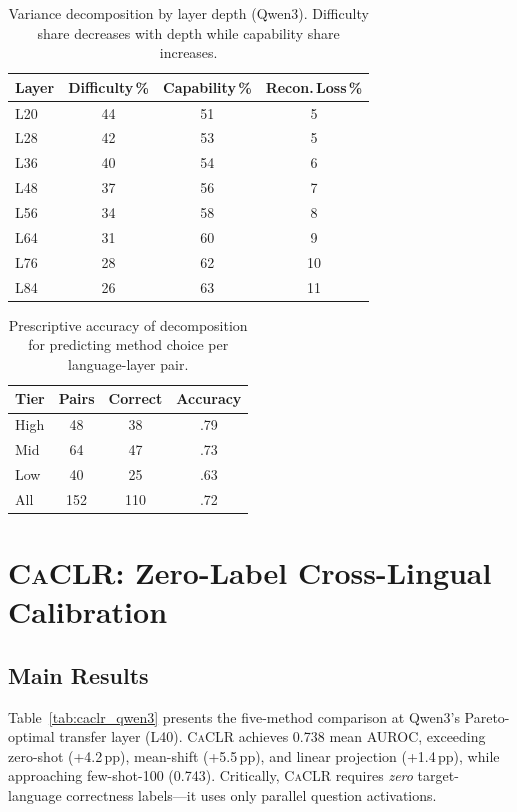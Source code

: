 \documentclass[11pt,a4paper]{article}
\newcommand{\caclr}{\textsc{CaCLR}}
\begin{document}
\begin{table}[t]
\centering
\small
\caption{Variance decomposition by layer depth (Qwen3). Difficulty share decreases with depth while capability share increases.}
\label{tab:variance_decomposition}
\begin{tabular}{lccc}
\toprule
Layer & Difficulty\,\% & Capability\,\% & Recon.\,Loss\,\% \\
\midrule
L20 & 44 & 51 & 5 \\
L28 & 42 & 53 & 5 \\
L36 & 40 & 54 & 6 \\
L48 & 37 & 56 & 7 \\
L56 & 34 & 58 & 8 \\
L64 & 31 & 60 & 9 \\
L76 & 28 & 62 & 10 \\
L84 & 26 & 63 & 11 \\
\bottomrule
\end{tabular}
\end{table}

\begin{table}[t]
\centering
\small
\caption{Prescriptive accuracy of decomposition for predicting method choice per language-layer pair.}
\label{tab:prescriptive}
\begin{tabular}{lccc}
\toprule
Tier & Pairs & Correct & Accuracy \\
\midrule
High & 48 & 38 & .79 \\
Mid & 64 & 47 & .73 \\
Low & 40 & 25 & .63 \\
\midrule
All & 152 & 110 & .72 \\
\bottomrule
\end{tabular}
\end{table}

\section{\caclr{}: Zero-Label Cross-Lingual Calibration}
\label{sec:caclr}

\subsection{Main Results}

Table~\ref{tab:caclr_qwen3} presents the five-method comparison at Qwen3's Pareto-optimal transfer layer (L40).
\caclr{} achieves 0.738 mean AUROC, exceeding zero-shot (+4.2\,pp), mean-shift (+5.5\,pp), and linear projection (+1.4\,pp), while approaching few-shot-100 (0.743).
Critically, \caclr{} requires \emph{zero} target-language correctness labels---it uses only parallel question activations.
\end{document}
